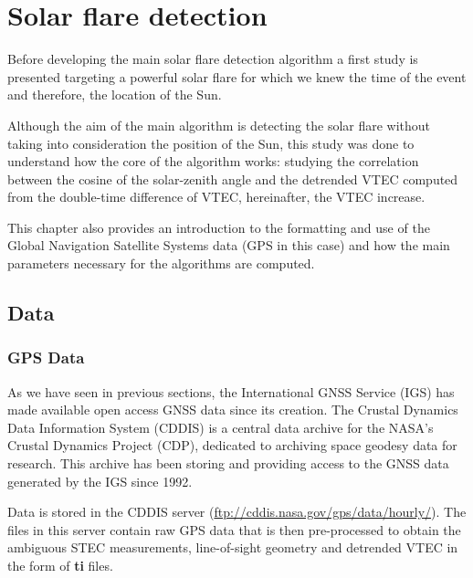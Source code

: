 \chapter{Solar flare detection}\label{solarFlareChapter}

Before developing the main solar flare detection algorithm a first study is presented targeting a powerful solar flare for which we knew the time of the event and therefore, the location of the Sun.

Although the aim of the main algorithm is detecting the solar flare without taking into consideration the position of the Sun, this study was done to understand how the core of the algorithm works: studying the correlation between the cosine of the solar-zenith angle and the detrended VTEC computed from the double-time difference of VTEC, hereinafter, the VTEC increase.

This chapter also provides an introduction to the formatting and use of the Global Navigation Satellite Systems data (GPS in this case) and how the main parameters necessary for the algorithms are computed.

\section{Data}

\subsection{GPS Data}

As we have seen in previous sections, the International GNSS Service (IGS) has made available open access GNSS data since its creation. The Crustal Dynamics Data Information System (CDDIS) is a central data archive for the NASA's Crustal Dynamics Project (CDP), dedicated to archiving space geodesy data for research. This archive has been storing and providing access to the GNSS data generated by the IGS since 1992.

Data is stored in the CDDIS server (\url{ftp://cddis.nasa.gov/gps/data/hourly/}). The files in this server contain raw GPS data that is then pre-processed to obtain the ambiguous STEC measurements, line-of-sight
geometry and detrended VTEC in the form of \textbf{ti} files. 




